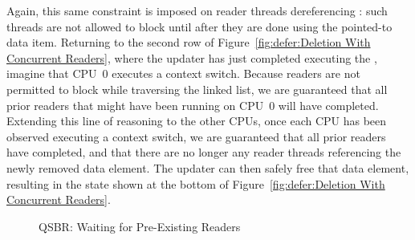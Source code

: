 Again, this same constraint is imposed on reader threads dereferencing
: such threads are not allowed to block until after
they are done using the pointed-to data item.
Returning to the second row of
Figure~\ref{fig:defer:Deletion With Concurrent Readers},
where the updater has just completed executing the ,
imagine that CPU~0 executes a context switch.
Because readers are not permitted to block while traversing the linked
list, we are guaranteed that all prior readers that might have been running on
CPU~0 will have completed.
Extending this line of reasoning to the other CPUs, once each CPU has
been observed executing a context switch, we are guaranteed that all
prior readers have completed, and that there are no longer any reader
threads referencing the newly removed data element.
The updater can then safely free that data element, resulting in the
state shown at the bottom of
Figure~\ref{fig:defer:Deletion With Concurrent Readers}.
\fi

\begin{figure}[tb]
\centering
{}
\caption{QSBR: Waiting for Pre-Existing Readers}
\label{fig:defer:QSBR: Waiting for Pre-Existing Readers}
\end{figure}

